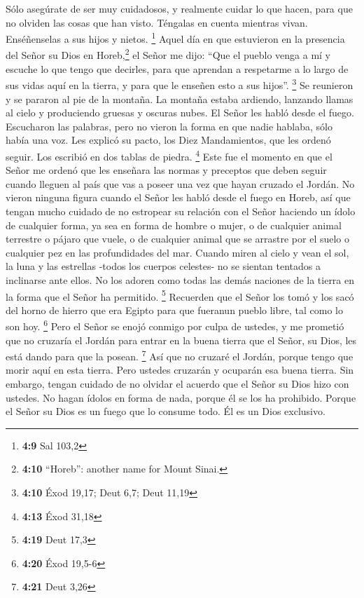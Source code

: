  Sólo asegúrate de ser muy cuidadosos, y realmente cuidar
lo que hacen, para que no olviden las cosas que han visto. Téngalas en
cuenta mientras vivan. Enséñenselas a sus hijos y nietos. \footnote{\textbf{4:9}
  Sal 103,2}  Aquel día en que estuvieron en la presencia
del Señor su Dios en Horeb,\footnote{\textbf{4:10} ``Horeb'': another
  name for Mount Sinai.} el Señor me dijo: ``Que el pueblo venga a mí y
escuche lo que tengo que decirles, para que aprendan a respetarme a lo
largo de sus vidas aquí en la tierra, y para que le enseñen esto a sus
hijos''. \footnote{\textbf{4:10} Éxod 19,17; Deut 6,7; Deut 11,19}
 Se reunieron y se pararon al pie de la montaña. La
montaña estaba ardiendo, lanzando llamas al cielo y produciendo gruesas
y oscuras nubes.  El Señor les habló desde el fuego.
Escucharon las palabras, pero no vieron la forma en que nadie hablaba,
sólo había una voz.  Les explicó su pacto, los Diez
Mandamientos, que les ordenó seguir. Los escribió en dos tablas de
piedra. \footnote{\textbf{4:13} Éxod 31,18}  Este fue el
momento en que el Señor me ordenó que les enseñara las normas y
preceptos que deben seguir cuando lleguen al país que vas a poseer una
vez que hayan cruzado el Jordán.  No vieron ninguna
figura cuando el Señor les habló desde el fuego en Horeb, así que tengan
mucho cuidado  de no estropear su relación con el Señor
haciendo un ídolo de cualquier forma, ya sea en forma de hombre o mujer,
 o de cualquier animal terrestre o pájaro que vuele,
 o de cualquier animal que se arrastre por el suelo o
cualquier pez en las profundidades del mar.  Cuando miren
al cielo y vean el sol, la luna y las estrellas -todos los cuerpos
celestes- no se sientan tentados a inclinarse ante ellos. No los adoren
como todas las demás naciones de la tierra en la forma que el Señor ha
permitido. \footnote{\textbf{4:19} Deut 17,3}  Recuerden
que el Señor los tomó y los sacó del horno de hierro que era Egipto para
que fueranun pueblo libre, tal como lo son hoy. \footnote{\textbf{4:20}
  Éxod 19,5-6}  Pero el Señor se enojó conmigo por culpa
de ustedes, y me prometió que no cruzaría el Jordán para entrar en la
buena tierra que el Señor, su Dios, les está dando para que la posean.
\footnote{\textbf{4:21} Deut 3,26}  Así que no cruzaré el
Jordán, porque tengo que morir aquí en esta tierra. Pero ustedes
cruzarán y ocuparán esa buena tierra.  Sin embargo,
tengan cuidado de no olvidar el acuerdo que el Señor su Dios hizo con
ustedes. No hagan ídolos en forma de nada, porque él se los ha
prohibido.  Porque el Señor su Dios es un fuego que lo
consume todo. Él es un Dios exclusivo.


